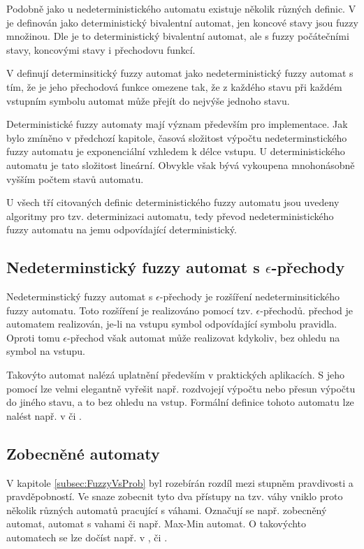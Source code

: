 \documentclass[a4paper,10pt]{article}
\begin{document}
Podobně jako u nedeterministického automatu existuje několik různých definic. V \cite{Bel-DetFuzAut} je definován jako deterministický bivalentní automat, jen koncové stavy jsou fuzzy množinou. Dle \cite{LiLiLi-RelAmoSevTypFuzAut} je to deterministický bivalentní automat, ale s fuzzy počátečními stavy, koncovými stavy i přechodovu funkcí.

V \cite{GonGar-FuzzLangInfRanAccGuzzAutPumLemDetProc} definují determinsitický fuzzy automat jako nedeterministický fuzzy automat s tím, že je jeho přechodová funkce omezene tak, že z každého stavu při každém vstupním symbolu automat může přejít do nejvýše jednoho stavu.

Deterministické fuzzy automaty mají význam především pro implementace. Jak bylo zmíněno v předchozí kapitole, časová složitost výpočtu nedeterminstického fuzzy automatu je exponenciální vzhledem k délce vstupu. U deterministického automatu je tato složitost lineární. Obvykle však bývá vykoupena mnohonásobně vyšším počtem stavů automatu.

U všech tří citovaných definic deterministického fuzzy automatu jsou uvedeny algoritmy pro tzv. determinizaci automatu, tedy převod nedeterministického fuzzy automatu na jemu odpovídající deterministický.

\subsection{Nedeterminstický fuzzy automat s $\epsilon$-přechody}
Nedeterminstický fuzzy automat s $\epsilon$-přechody je rozšíření nedeterminsitického fuzzy automatu. Toto rozšíření je realizováno pomocí tzv. $\epsilon$-přechodů.  přechod je automatem realizován, je-li na vstupu symbol odpovídající symbolu pravidla. Oproti tomu $\epsilon$-přechod však automat může realizovat kdykoliv, bez ohledu na symbol na vstupu.

Takovýto automat nalézá uplatnění především v praktických aplikacích. S jeho pomocí lze velmi elegantně vyřešit např. rozdvojejí výpočtu nebo přesun výpočtu do jiného stavu, a to bez ohledu na vstup. Formální definice tohoto automatu lze nalést např. v \cite{SnaKepAbrHas-AproxStriMatchFuzzAut} či \cite{LiLiLi-RelAmoSevTypFuzAut}. 

\subsection{Zobecněné automaty}
V kapitole \ref{subsec:FuzzyVsProb} byl rozebírán rozdíl mezi stupněm pravdivosti a pravděpobností. Ve snaze zobecnit tyto dva přístupy na tzv. váhy vniklo proto několik různých automatů pracující s váhami. Označují se např. zobecněný automat, automat s vahami či např. Max-Min automat. O takovýchto automatech se lze dočíst např. v \cite{MorMal-FuzzyAutLang}, \cite{DooKre-NewDirFuzzAut} či \cite{San-MaxAut}. 
\end{document}
